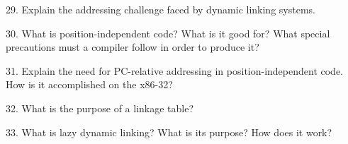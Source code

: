 \filbreak
\vskip 1cm

29. Explain the addressing challenge faced by dynamic linking systems.

\filbreak
\vskip 1cm

30. What is position-independent code? What is it good for? What special precautions must a compiler follow in order to produce it?

\filbreak
\vskip 1cm

31. Explain the need for PC-relative addressing in position-independent code. How is it accomplished on the x86-32?

\filbreak
\vskip 1cm

32. What is the purpose of a linkage table?

\filbreak
\vskip 1cm

33. What is lazy dynamic linking? What is its purpose? How does it work?

\filbreak
\vfill\eject
\bye
